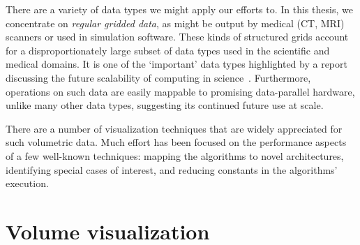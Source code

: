 There are a variety of data types we might apply our efforts to.  In
this thesis, we concentrate on \textit{regular gridded data}, as might
be output by medical (CT, MRI) scanners or used in simulation software.
These kinds of structured grids account for a disproportionately large
subset of data types used in the scientific and medical domains.  It is
one of the `important' data types highlighted by a report discussing
the future scalability of computing in
science~\cite{Berkeley:2006:View}.  Furthermore, operations on such
data are easily mappable to promising data-parallel hardware, unlike
many other data types, suggesting its continued future use at scale.



There are a number of visualization techniques that are widely
appreciated for such volumetric data.  Much effort has been focused
on the performance aspects of a few well-known techniques: mapping
the algorithms to novel architectures, identifying special cases of
interest, and reducing constants in the algorithms' execution.


%
%

\section{Volume visualization}


